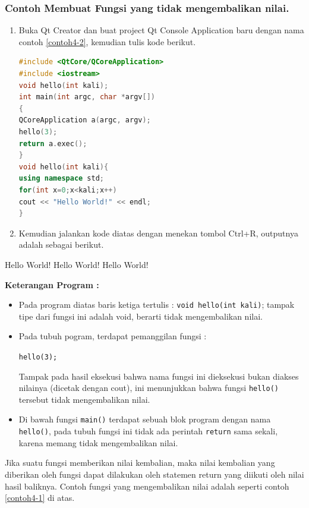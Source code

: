 \subsubsection*{Contoh  Membuat Fungsi yang tidak mengembalikan nilai.}

\begin{enumerate}

\item
  Buka Qt Creator dan buat project Qt Console Application baru dengan
  nama contoh \ref{contoh4-2}, kemudian tulis kode berikut.

\begin{lstlisting}[language=c++, caption=Membuat Fungsi yang tidak mengembalikan nilai, label=contoh4-2]
#include <QtCore/QCoreApplication>
#include <iostream>
void hello(int kali);
int main(int argc, char *argv[])
{
QCoreApplication a(argc, argv);
hello(3);
return a.exec();
}
void hello(int kali){
using namespace std;
for(int x=0;x<kali;x++)
cout << "Hello World!" << endl;
}      
\end{lstlisting}
\item
  Kemudian jalankan kode diatas dengan menekan tombol Ctrl+R, outputnya
  adalah sebagai berikut.
\end{enumerate}
\begin{lcverbatim}
Hello World!
Hello World!
Hello World!
\end{lcverbatim}


\textbf{Keterangan Program :}

\begin{itemize}
\item
  Pada program diatas baris ketiga tertulis :
  \texttt{void\ hello(int\ kali)}; tampak tipe dari fungsi ini adalah
  void, berarti tidak mengembalikan nilai.
\item
  Pada tubuh pogram, terdapat pemanggilan fungsi :


\texttt{hello(3);}

Tampak pada hasil eksekusi bahwa nama fungsi ini dieksekusi bukan
diakses nilainya (dicetak dengan cout), ini menunjukkan bahwa fungsi
\texttt{hello()} tersebut tidak mengembalikan nilai.


\item
  Di bawah fungsi \texttt{main()} terdapat sebuah blok program dengan
  nama \texttt{hello()}, pada tubuh fungsi ini tidak ada perintah
  \texttt{return} sama sekali, karena memang tidak mengembalikan nilai.
\end{itemize}

Jika suatu fungsi memberikan nilai kembalian, maka nilai kembalian yang
diberikan oleh fungsi dapat dilakukan oleh statemen return yang diikuti
oleh nilai hasil baliknya. Contoh fungsi yang mengembalikan nilai adalah
seperti contoh \ref{contoh4-1} di atas.

